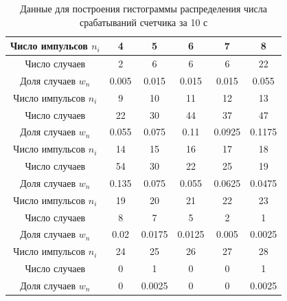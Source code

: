 \documentclass[a4paper,12pt]{article}
\begin{document}
\begin{table}[H]
\centering
\caption{Данные для построения гистограммы распределения числа срабатываний счетчика за 10 с} \label{10c}
\begin{tabular}{|c|c|c|c|c|c|}
\hline 
Число импульсов $n_i$ & 4 & 5 & 6 & 7 & 8 \\ 
\hline 
Число случаев & 2 & 6 & 6 & 6 & 22 \\ 
\hline 
Доля случаев $w_n$ & 0.005 & 0.015 & 0.015 & 0.015 & 0.055 \\ 
\hline 
\hline 
Число импульсов $n_i$ & 9 & 10 & 11 & 12 & 13 \\ 
\hline 
Число случаев & 22 & 30 & 44 & 37 & 47 \\ 
\hline 
Доля случаев $w_n$ & 0.055 & 0.075 & 0.11 & 0.0925 & 0.1175 \\ 
\hline 
\hline 
Число импульсов $n_i$ & 14 & 15 & 16 & 17 & 18 \\ 
\hline 
Число случаев & 54 & 30 & 22 & 25 & 19 \\ 
\hline 
Доля случаев $w_n$ & 0.135 & 0.075 & 0.055 & 0.0625 & 0.0475 \\ 
\hline 
\hline 
Число импульсов $n_i$ & 19 & 20 & 21 & 22 & 23 \\ 
\hline 
Число случаев & 8 & 7 & 5 & 2 & 1 \\ 
\hline 
Доля случаев $w_n$ & 0.02 & 0.0175 & 0.0125 & 0.005 & 0.0025 \\ 
\hline 
\hline 
Число импульсов $n_i$ & 24 & 25 & 26 & 27 & 28\\ 
\hline 
Число случаев & 0 & 1 & 0 & 0 & 1\\ 
\hline 
Доля случаев $w_n$ & 0 & 0.0025 & 0 & 0 & 0.0025\\ 
\hline 

\end{tabular} 
\end{table}
\end{document}
